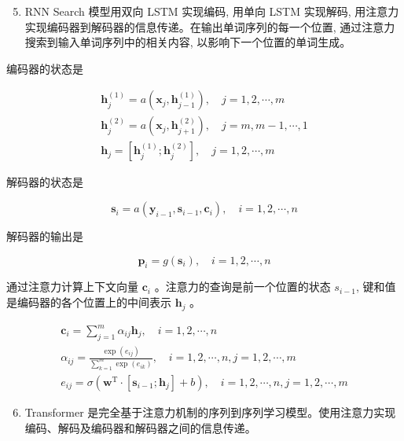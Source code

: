 \documentclass[10pt]{article}
\begin{document}
\begin{enumerate}
  \setcounter{enumi}{4}
  \item RNN Search 模型用双向 LSTM 实现编码, 用单向 LSTM 实现解码, 用注意力实现编码器到解码器的信息传递。在输出单词序列的每一个位置, 通过注意力搜索到输入单词序列中的相关内容, 以影响下一个位置的单词生成。
\end{enumerate}

编码器的状态是

$$
\begin{gathered}
\boldsymbol{h}_{j}^{(1)}=a\left(\boldsymbol{x}_{j}, \boldsymbol{h}_{j-1}^{(1)}\right), \quad j=1,2, \cdots, m \\
\boldsymbol{h}_{j}^{(2)}=a\left(\boldsymbol{x}_{j}, \boldsymbol{h}_{j+1}^{(2)}\right), \quad j=m, m-1, \cdots, 1 \\
\boldsymbol{h}_{j}=\left[\boldsymbol{h}_{j}^{(1)} ; \boldsymbol{h}_{j}^{(2)}\right], \quad j=1,2, \cdots, m
\end{gathered}
$$

解码器的状态是

$$
\boldsymbol{s}_{i}=a\left(\boldsymbol{y}_{i-1}, \boldsymbol{s}_{i-1}, \boldsymbol{c}_{i}\right), \quad i=1,2, \cdots, n
$$

解码器的输出是

$$
\boldsymbol{p}_{i}=g\left(\boldsymbol{s}_{i}\right), \quad i=1,2, \cdots, n
$$

通过注意力计算上下文向量 $\boldsymbol{c}_{i}$ 。注意力的查询是前一个位置的状态 $s_{i-1}$, 键和值是编码器的各个位置上的中间表示 $\boldsymbol{h}_{j}$ 。

$$
\begin{gathered}
\boldsymbol{c}_{i}=\sum_{j=1}^{m} \alpha_{i j} \boldsymbol{h}_{j}, \quad i=1,2, \cdots, n \\
\alpha_{i j}=\frac{\exp \left(e_{i j}\right)}{\sum_{k=1}^{m} \exp \left(e_{i k}\right)}, \quad i=1,2, \cdots, n, j=1,2, \cdots, m \\
e_{i j}=\sigma\left(\boldsymbol{w}^{\mathrm{T}} \cdot\left[\boldsymbol{s}_{i-1} ; \boldsymbol{h}_{j}\right]+b\right), \quad i=1,2, \cdots, n, j=1,2, \cdots, m
\end{gathered}
$$

\begin{enumerate}
  \setcounter{enumi}{5}
  \item Transformer 是完全基于注意力机制的序列到序列学习模型。使用注意力实现编码、解码及编码器和解码器之间的信息传递。
\end{enumerate}
\end{document}
